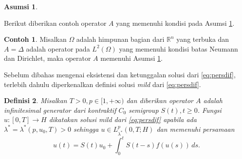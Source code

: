 \documentclass[journal]{IEEEtran}
\newtheorem{defn}{Definisi}[section]
\newtheorem{asumsi}[defn]{Asumsi}
\theoremstyle{definition}
\newtheorem{con}{Contoh}[section]
\theoremstyle{definition}
\theoremstyle{plain}
\newcommand{\R}{\mathbb{R}}
\begin{document}
\begin{asumsi}\label{asumsi}
\end{asumsi}
Berikut diberikan contoh operator $A$ yang memenuhi kondisi pada Asumsi \ref{asumsi}.

\begin{con}\label{con:asumsiA}
    Misalkan $\Omega$ adalah himpunan bagian dari $\R^n$ yang terbuka dan $A=\Delta$ adalah operator pada $L^2(\Omega)$ yang memenuhi kondisi batas Neumann dan Dirichlet, maka operator $A$ memenuhi Asumsi \ref{asumsi}.
\end{con}

Sebelum dibahas mengenai eksistensi dan ketunggalan solusi dari \eqref{eq:persdif}, terlebih dahulu diperkenalkan definisi solusi \textit{mild} dari \eqref{eq:persdif}. 

\begin{defn}
    \cite{Pazy1983} Misalkan $T>0,p\in [1,+\infty)$ dan diberikan operator $A$ adalah infinitesimal generator dari kontraktif $C_0$ semigroup $S(t), t\geq 0$. Fungsi $u:[0,T]\rightarrow H$ dikatakan solusi \textit{mild} dari \eqref{eq:persdif} apabila ada $\lambda^*=\lambda^* (p,u_0,T)>0$ sehingga $u\in L^p_{\lambda^*}(0,T;H)$ dan memenuhi persamaan 
    \begin{equation}
        u(t)=S(t)u_0+\int_0^t S(t-s)f(u(s))\, ds. \label{eq:solusimild}
    \end{equation}
\end{defn}
\end{document}

